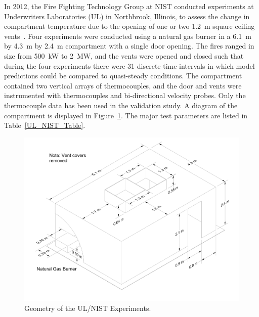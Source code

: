 In 2012, the Fire Fighting Technology Group at NIST conducted experiments at Underwriters Laboratories (UL) in Northbrook, Illinois, to assess the change in compartment temperature due to the opening of one or two 1.2~m square ceiling vents~\cite{Opert:Masters}. Four experiments were conducted using a natural gas burner in a 6.1~m by 4.3~m by 2.4~m compartment with a single door opening. The fires ranged in size from 500~kW to 2~MW, and the vents were opened and closed such that during the four experiments there were 31 discrete time intervals in which model predictions could be compared to quasi-steady conditions. The compartment contained two vertical arrays of thermocouples, and the door and vents were instrumented with thermocouples and bi-directional velocity probes. Only the thermocouple data has been used in the validation study. A diagram of the compartment is displayed in Figure~\ref{UL_NIST_Drawing}. The major test parameters are listed in Table~\ref{UL_NIST_Table}.

\begin{figure}[ht]
\includegraphics[width=\textwidth]{FIGURES/UL_NIST_Vents/UL_NIST_Vents_Drawing}
\caption{Geometry of the UL/NIST Experiments.}
\label{UL_NIST_Drawing}
\end{figure}


